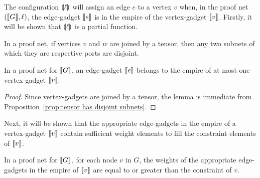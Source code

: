 \documentclass{lmcs}
\begin{document}
The configuration $\llparenthesis\ell\rrparenthesis$ will assign an edge $e$ to a vertex $v$ when, in the proof net $(\llbracket G\rrbracket,\ell)$, the edge-gadget $\llbracket e\rrbracket$ is in the empire of the vertex-gadget $\llbracket v\rrbracket$.
%
Firstly, it will be shown that $\llparenthesis\ell\rrparenthesis$ is a partial function.


\begin{proposition}
\label{prop:tensor has disjoint subnets}
In a proof net, if vertices $v$ and $w$ are joined by a tensor, then any two subnets of which they are respective ports are disjoint.
\end{proposition}


\begin{lemma}
In a proof net for $\llbracket G\rrbracket$, an edge-gadget $\llbracket e\rrbracket$ belongs to the empire of at most one vertex-gadget $\llbracket v\rrbracket$.
\end{lemma}

\begin{proof}
Since vertex-gadgets are joined by a tensor, the lemma is immediate from Proposition~\ref{prop:tensor has disjoint subnets}.
\end{proof}


Next, it will be shown that the appropriate edge-gadgets in the empire of a vertex-gadget $\llbracket v\rrbracket$ contain sufficient weight elements to fill the constraint elements of $\llbracket v\rrbracket$.


\begin{lemma}
\label{lem:appropriate edge weights}
In a proof net for $\llbracket G\rrbracket$, for each node $v$ in $G$, the weights of the appropriate edge-gadgets in the empire of $\llbracket v\rrbracket$ are equal to or greater than the constraint of $v$.
\end{lemma}
\end{document}
